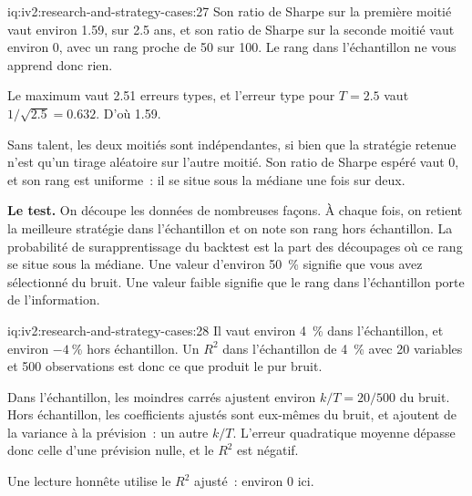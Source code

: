 \begin{solution}{iq:iv2:research-and-strategy-cases:27}
Son ratio de Sharpe sur la première moitié vaut environ 1.59, sur 2.5 ans, et son ratio de Sharpe sur la seconde moitié vaut environ 0, avec un rang proche de 50 sur 100. Le rang dans l'échantillon ne vous apprend donc rien.

Le maximum vaut 2.51 erreurs types, et l'erreur type pour $T = 2.5$ vaut $1/\sqrt{2.5} = 0.632$. D'où 1.59.

Sans talent, les deux moitiés sont indépendantes, si bien que la stratégie retenue n'est qu'un tirage aléatoire sur l'autre moitié. Son ratio de Sharpe espéré vaut 0, et son rang est uniforme~: il se situe sous la médiane une fois sur deux.

\textbf{Le test.} On découpe les données de nombreuses façons. À chaque fois, on retient la meilleure stratégie dans l'échantillon et on note son rang hors échantillon. La probabilité de surapprentissage du backtest est la part des découpages où ce rang se situe sous la médiane. Une valeur d'environ 50~\% signifie que vous avez sélectionné du bruit. Une valeur faible signifie que le rang dans l'échantillon porte de l'information.

\end{solution}

\begin{solution}{iq:iv2:research-and-strategy-cases:28}
Il vaut environ 4~\% dans l'échantillon, et environ $-4~\%$ hors échantillon. Un $R^2$ dans l'échantillon de 4~\% avec 20 variables et 500 observations est donc ce que produit le pur bruit.

Dans l'échantillon, les moindres carrés ajustent environ $k/T = 20/500$ du bruit. Hors échantillon, les coefficients ajustés sont eux-mêmes du bruit, et ajoutent de la variance à la prévision~: un autre $k/T$. L'erreur quadratique moyenne dépasse donc celle d'une prévision nulle, et le $R^2$ est négatif.

Une lecture honnête utilise le $R^2$ ajusté~: environ 0 ici.

\end{solution}

